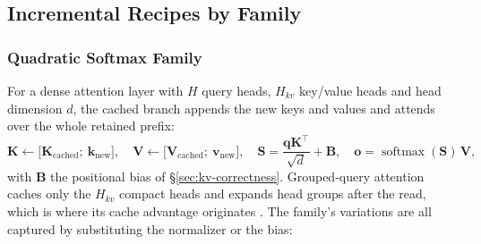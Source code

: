 \subsection{Incremental Recipes by Family}
\label{sec:kv-recipes}

\subsubsection{Quadratic Softmax Family}

For a dense attention layer with $H$ query heads, $H_{kv}$ key/value heads and head dimension $d$, the cached branch appends the new keys and values and attends over the whole retained prefix:
\[
\mathbf{K} \gets \big[\mathbf{K}_{\text{cached}};\ \mathbf{k}_{\text{new}}\big],\quad
\mathbf{V} \gets \big[\mathbf{V}_{\text{cached}};\ \mathbf{v}_{\text{new}}\big],\quad
\mathbf{S} = \frac{\mathbf{q}\mathbf{K}^\top}{\sqrt d} + \mathbf{B},\quad
\mathbf{o} = \operatorname{softmax}(\mathbf{S})\,\mathbf{V},
\]
with $\mathbf{B}$ the positional bias of \S\ref{sec:kv-correctness}. Grouped-query attention caches only the $H_{kv}$ compact heads and expands head groups after the read, which is where its cache advantage originates \citep{ainslie_gqa_2023}. The family's variations are all captured by substituting the normalizer or the bias:

